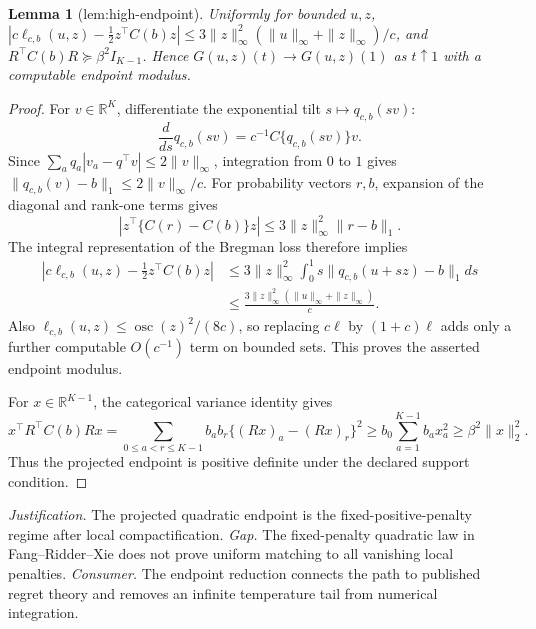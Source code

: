 \documentclass{article}
\newtheorem{lemma}{Lemma}
\begin{document}
\begin{lemma}[lem:high-endpoint]\label{lem:high-endpoint}
Uniformly for bounded \(u,z\), \(\left|c\ell_{c,b}(u,z)-\frac12z^{\top}C(b)z\right|\le3\|z\|_\infty^2(\|u\|_\infty+\|z\|_\infty)/c\), and \(R^{\top}C(b)R\succeq\beta^2I_{K-1}\). Hence \(G(u,z)(t)\to G(u,z)(1)\) as \(t\uparrow1\) with a computable endpoint modulus.
\end{lemma}
\begin{proof}
For \(v\in\mathbb R^K\), differentiate the exponential tilt \(s\mapsto q_{c,b}(sv)\):
\[
 \frac{d}{ds}q_{c,b}(sv)=c^{-1}C\{q_{c,b}(sv)\}v.
\]
Since \(\sum_a q_a|v_a-q^\top v|\le2\|v\|_\infty\), integration from \(0\) to \(1\) gives \(\|q_{c,b}(v)-b\|_1\le2\|v\|_\infty/c\).  For probability vectors \(r,b\), expansion of the diagonal and rank-one terms gives
\[
 |z^\top\{C(r)-C(b)\}z|
 \le3\|z\|_\infty^2\|r-b\|_1.
\]
The integral representation of the Bregman loss therefore implies
\[
 \begin{aligned}
 \left|c\ell_{c,b}(u,z)-\tfrac12z^\top C(b)z\right|
 &\le3\|z\|_\infty^2\int_0^1s\|q_{c,b}(u+sz)-b\|_1ds\\
 &\le \frac{3\|z\|_\infty^2(\|u\|_\infty+\|z\|_\infty)}{c}.
 \end{aligned}
\]
Also \(\ell_{c,b}(u,z)\le\operatorname{osc}(z)^2/(8c)\), so replacing \(c\ell\) by \((1+c)\ell\) adds only a further computable \(O(c^{-1})\) term on bounded sets.  This proves the asserted endpoint modulus.

For \(x\in\mathbb R^{K-1}\), the categorical variance identity gives
\[
 x^\top R^\top C(b)Rx
 =\sum_{0\le a<r\le K-1}b_ab_r\{(Rx)_a-(Rx)_r\}^2
 \ge b_0\sum_{a=1}^{K-1}b_ax_a^2
 \ge\beta^2\|x\|_2^2.
\]
Thus the projected endpoint is positive definite under the declared support condition.
\end{proof}
\par\smallskip\noindent \textit{Justification.} The projected quadratic endpoint is the fixed-positive-penalty regime after local compactification. \textit{Gap.} The fixed-penalty quadratic law in Fang--Ridder--Xie does not prove uniform matching to all vanishing local penalties. \textit{Consumer.} The endpoint reduction connects the path to published regret theory and removes an infinite temperature tail from numerical integration.
\end{document}

